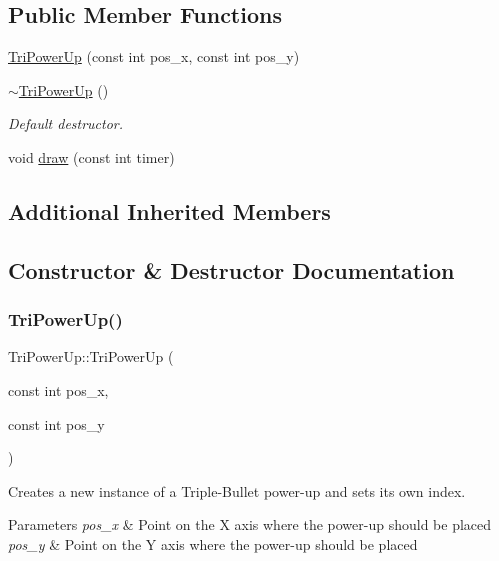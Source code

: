 \subsection*{Public Member Functions}
\begin{DoxyCompactItemize}
\item 
\hyperlink{classTriPowerUp_a67d6278e6c22cf50f3b15763dbb6da88}{Tri\+Power\+Up} (const int pos\+\_\+x, const int pos\+\_\+y)
\item 
\hyperlink{classTriPowerUp_a243237700fae7d620aae0f8d308533f1}{$\sim$\+Tri\+Power\+Up} ()
\begin{DoxyCompactList}\small\item\em Default destructor. \end{DoxyCompactList}\item 
void \hyperlink{classTriPowerUp_a06af18b739589c56a90da91716243acf}{draw} (const int timer)
\end{DoxyCompactItemize}
\subsection*{Additional Inherited Members}


\subsection{Constructor \& Destructor Documentation}
\mbox{\label{classTriPowerUp_a67d6278e6c22cf50f3b15763dbb6da88}} 
\subsubsection{\texorpdfstring{Tri\+Power\+Up()}{TriPowerUp()}}
{\footnotesize\ttfamily Tri\+Power\+Up\+::\+Tri\+Power\+Up (\begin{DoxyParamCaption}\item[{const int}]{pos\+\_\+x,  }\item[{const int}]{pos\+\_\+y }\end{DoxyParamCaption})}

Creates a new instance of a Triple-\/\+Bullet power-\/up and sets it\textquotesingle{}s own index.


\begin{DoxyParams}{Parameters}
{\em pos\+\_\+x} & Point on the X axis where the power-\/up should be placed \\
\hline
{\em pos\+\_\+y} & Point on the Y axis where the power-\/up should be placed \\
\hline
\end{DoxyParams}
\mbox{\label{classTriPowerUp_a243237700fae7d620aae0f8d308533f1}} 
